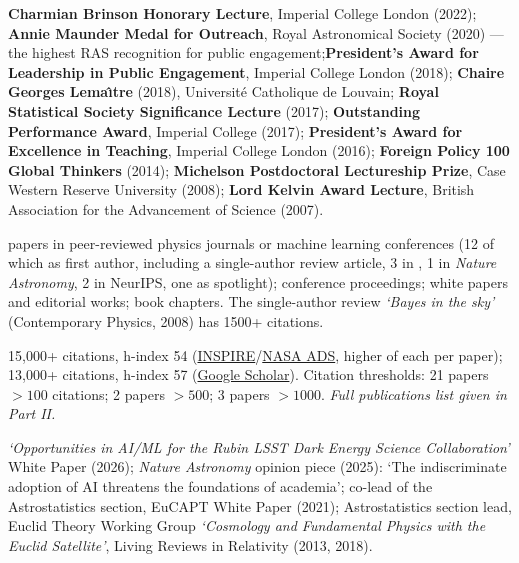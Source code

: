 
\textbf{Charmian Brinson Honorary Lecture}, Imperial College London (2022); \textbf{Annie Maunder Medal for Outreach}, Royal Astronomical Society (2020) --- the highest RAS recognition for public engagement;\textbf{President's Award for Leadership in Public Engagement}, Imperial College London (2018); \textbf{Chaire Georges Lema\^{\i}tre} (2018), Universit\'e Catholique de Louvain; \textbf{Royal Statistical Society Significance Lecture} (2017); \textbf{Outstanding Performance Award}, Imperial College (2017); \textbf{President's Award for Excellence in Teaching}, Imperial College London (2016); \textbf{Foreign Policy 100 Global Thinkers} (2014); \textbf{Michelson Postdoctoral Lectureship Prize}, Case Western Reserve University (2008); \textbf{Lord Kelvin Award Lecture}, British Association for the Advancement of Science (2007).


 papers in peer-reviewed physics journals or machine learning conferences (12 of which as first author, including a single-author review article, 3 in \PRL, 1 in {\em Nature Astronomy}, 2 in NeurIPS, one as spotlight);  conference proceedings;  white papers and editorial works;  book chapters.
The single-author review {\itshape `Bayes in the sky'} (Contemporary Physics, 2008) has 1500+ citations.

15{,}000+ citations, h-index 54 (\href{https://inspirehep.net/literature?sort=mostrecent&size=25&page=1&q=a%20R.Trotta.1&ui-citation-summary=true}{INSPIRE}/\href{https://ui.adsabs.harvard.edu/search/q=orcid%3A0000-0002-3415-0707&sort=date%20desc%2C%20bibcode%20desc&p_=0}{NASA ADS}, higher of each per paper); 13{,}000+ citations, h-index 57 (\href{https://scholar.google.com/citations?user=V5FvaSYAAAAJ}{Google Scholar}). Citation thresholds: 21 papers $>\!100$ citations; 2 papers $>\!500$; 3 papers $>\!1000$. {\itshape Full publications list given in Part II.}

{\itshape `Opportunities in AI/ML for the Rubin LSST Dark Energy Science Collaboration'} White Paper (2026);
{\itshape Nature Astronomy} opinion piece (2025): `The indiscriminate adoption of AI threatens the foundations of academia'; co-lead of the Astrostatistics section, EuCAPT White Paper (2021); Astrostatistics section lead, Euclid Theory Working Group {\itshape `Cosmology and Fundamental Physics with the Euclid Satellite'}, Living Reviews in Relativity (2013, 2018).


